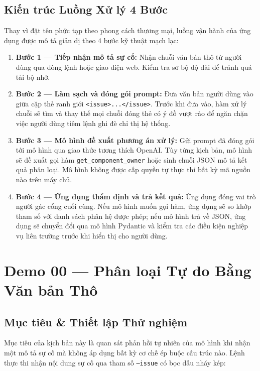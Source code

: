 \documentclass[11pt,a4paper]{article}
\begin{document}
\subsection{Kiến trúc Luồng Xử lý 4 Bước}

Thay vì đặt tên phức tạp theo phong cách thương mại, luồng vận hành của ứng dụng được mô tả giản dị theo 4 bước kỹ thuật mạch lạc:

\begin{enumerate}
  \item \textbf{Bước 1 --- Tiếp nhận mô tả sự cố:} Nhận chuỗi văn bản thô từ người dùng qua dòng lệnh hoặc giao diện web. Kiểm tra sơ bộ độ dài để tránh quá tải bộ nhớ.
  \item \textbf{Bước 2 --- Làm sạch và đóng gói prompt:} Đưa văn bản người dùng vào giữa cặp thẻ ranh giới \texttt{<issue>...</issue>}. Trước khi đưa vào, hàm xử lý chuỗi sẽ tìm và thay thế mọi chuỗi đóng thẻ có ý đồ vượt rào để ngăn chặn việc người dùng tiêm lệnh ghi đè chỉ thị hệ thống.
  \item \textbf{Bước 3 --- Mô hình đề xuất phương án xử lý:} Gửi prompt đã đóng gói tới mô hình qua giao thức tương thích OpenAI. Tùy từng kịch bản, mô hình sẽ đề xuất gọi hàm \texttt{get\_component\_owner} hoặc sinh chuỗi JSON mô tả kết quả phân loại. Mô hình không được cấp quyền tự thực thi bất kỳ mã nguồn nào trên máy chủ.
  \item \textbf{Bước 4 --- Ứng dụng thẩm định và trả kết quả:} Ứng dụng đóng vai trò người gác cổng cuối cùng. Nếu mô hình muốn gọi hàm, ứng dụng sẽ so khớp tham số với danh sách phân hệ được phép; nếu mô hình trả về JSON, ứng dụng sẽ chuyển đổi qua mô hình Pydantic và kiểm tra các điều kiện nghiệp vụ liên trường trước khi hiển thị cho người dùng.
\end{enumerate}

\section{Demo 00 — Phân loại Tự do Bằng Văn bản Thô}

\subsection{Mục tiêu \& Thiết lập Thử nghiệm}

Mục tiêu của kịch bản này là quan sát phản hồi tự nhiên của mô hình khi nhận một mô tả sự cố mà không áp dụng bất kỳ cơ chế ép buộc cấu trúc nào. Lệnh thực thi nhận nội dung sự cố qua tham số \texttt{--issue} có bọc dấu nháy kép:
\end{document}
